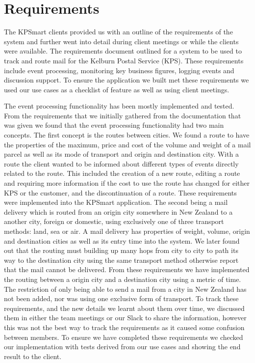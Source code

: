 \documentclass{style/CRPITStyle}
\begin{document}
\section{Requirements}

The KPSmart clients provided us with an outline of the requirements of the
system and further went into detail during client meetings or while the clients
were available. The requirements document outlined for a system to be used to
track and route mail for the Kelburn Postal Service (KPS). These requirements
include event processing, monitoring key business figures, logging events and
discussion support. To ensure the application we built met these requirements we
used our use cases as a checklist of feature as well as using client meetings.

\vspace{.1in}

The event processing functionality has been mostly implemented and tested. From the
requirements that we initially gathered from the documentation that was given we
found that the event processing functionality had two main concepts.
The first concept is the routes between cities.
We found a route to have the properties of the maximum, price and cost of the
volume and weight of a mail parcel as well as its mode of transport and origin
and destination city. With a route the client wanted to be informed about
different types of events directly related to the route. This included the
creation of a new route, editing a route and requiring more information if the
cost to use the route has changed for either KPS or the customer, and the
discontinuation of a route. These requirements were implemented into the
KPSmart application.
The second being a mail delivery which is routed from an origin city somewhere in
New Zealand to a another city, foreign or domestic, using exclusively one of three
transport methods: land, sea or air. A mail delivery has properties of weight,
volume, origin and destination cities as well as its entry time into the system.
We later found out that the routing must
building up many hops from city to city to path its way to the destination city
using the same transport method otherwise report that the mail cannot be
delivered. From these requirements we have implemented the routing between a
origin city and a destination city using a metric of time. The restriction of
only being able to send a mail from a city in New Zealand has not been added,
nor was using one exclusive form of transport. To track these requirements, and
the new details we learnt about them over time, we discussed them in either the
team meetings or our Slack to share the information, however this was not the
best way to track the requirements as it caused some confusion between members.
To ensure we have completed these requirements we checked our implementation
with tests derived from our use cases and showing the end result to the client.
\end{document}
